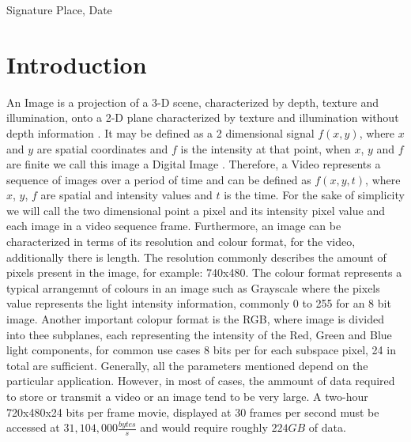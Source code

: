 \documentclass[a4paper,11pt,oneside]{article}
\begin{document}
  \vspace{20mm}

  Signature \hfill Place, Date

  \newpage
  \begin{abstract}
 
  
  \end{abstract}

  
  \clearpage
  \fi



  \newpage
  \tableofcontents

  \newpage
  \listoffigures

  \newpage

  \section{Introduction}
  \indent An Image is a projection of a 3-D scene, characterized by depth, texture and illumination, onto a 2-D plane characterized by texture and illumination 
  without depth information \cite[p.~5]{richardson2002video}. It may be defined as a 2 dimensional signal $ f(x, y) $, where $x$ and $y$ are spatial 
  coordinates and $f$ is the intensity at that point, when $x$, $y$ and $f$ are finite we call this image a Digital Image \cite[p.~1]{gonzalez2008digital}. 
  Therefore, a Video represents a sequence of images over a period of time and can be defined as $f(x,y,t)$, where $x$, $y$, $f$ are spatial and intensity values 
  and $t$ is the time. For the sake of simplicity we will call the two dimensional point a pixel and its intensity pixel value and each image in a video sequence frame. 
  Furthermore, an image can be characterized in terms of its resolution and colour format, for the video, additionally there is length. The resolution
  commonly describes the amount of pixels present in the image, for example: 740x480. The colour format represents a typical arrangemnt of colours in an image such as Grayscale
  where the pixels value represents the light intensity information, commonly 0 to 255 for an 8 bit image. Another important colopur format is the RGB, where image is divided 
  into thee subplanes, each representing the intensity of the Red, Green and Blue light components, for common use cases 8 bits per for each subspace pixel, 24 in total are sufficient.
  Generally, all the parameters mentioned depend on the particular application. However, in most of cases, the ammount of data required to store or transmit a video or an image
  tend to be very large. A two-hour 720x480x24 bits per frame movie, displayed at 30 frames per second must be accessed at $ 31,104,000 \frac{bytes}{s}$ and would require roughly $224 GB$
  of data. \cite[p.~525-526]{gonzalez2008digital}
\end{document}
